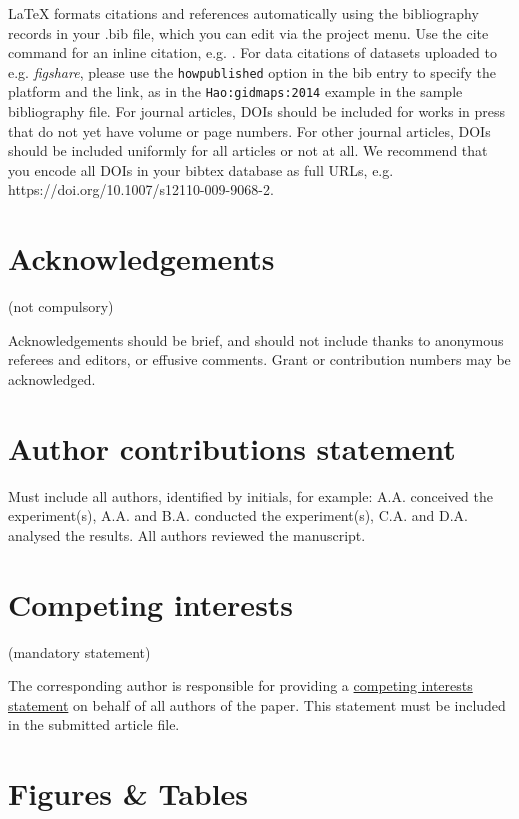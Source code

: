\documentclass[fleqn,10pt]{wlscirep}
\begin{document}


\noindent LaTeX formats citations and references automatically using the bibliography
records in your .bib file, which you can edit via the project menu. Use the cite command
for an inline citation, e.g. \cite{Kaufman2020, Figueredo:2009dg, Babichev2002,
behringer2014manipulating}. For data citations of datasets uploaded to e.g.
\emph{figshare}, please use the \verb|howpublished| option in the bib entry to specify
the platform and the link, as in the \verb|Hao:gidmaps:2014| example in the sample
bibliography file. For journal articles, DOIs should be included for works in press that
do not yet have volume or page numbers. For other journal articles, DOIs should be
included uniformly for all articles or not at all. We recommend that you encode all DOIs
in your bibtex database as full URLs, e.g. https://doi.org/10.1007/s12110-009-9068-2.

\section*{Acknowledgements} (not compulsory)

Acknowledgements should be brief, and should not include thanks to anonymous referees
and editors, or effusive comments. Grant or contribution numbers may be acknowledged.

\section*{Author contributions statement}

Must include all authors, identified by initials, for example: A.A. conceived the
experiment(s), A.A. and B.A. conducted the experiment(s), C.A. and D.A. analysed the
results. All authors reviewed the manuscript.

\section*{Competing interests} (mandatory statement)

The corresponding author is responsible for providing a
\href{https://www.nature.com/sdata/policies/editorial-and-publishing-policies#competing}{competing
interests statement} on behalf of all authors of the paper. This statement must be
included in the submitted article file.

\section*{Figures \& Tables}
\end{document}
